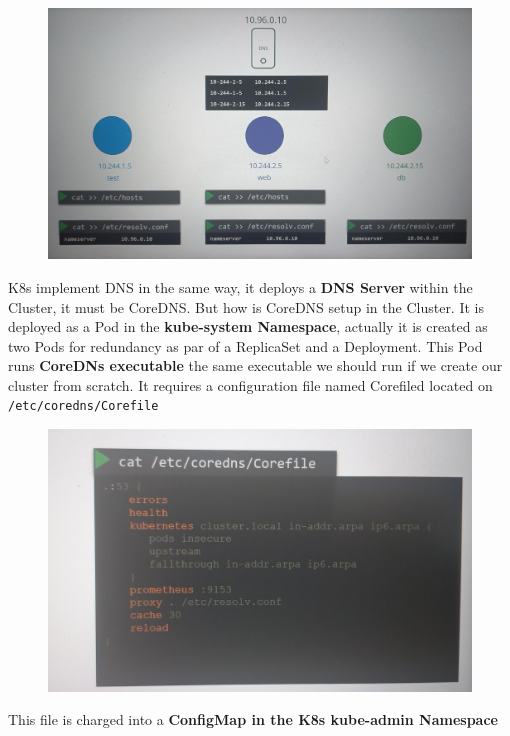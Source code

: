 \documentclass{article}
\begin{document}
\begin{figure}[H]
    \centering
    \includegraphics[width=\textwidth]{pictures/ingress2.png}
\end{figure}

K8s implement DNS in the same way, it deploys a \textbf{DNS Server} within the Cluster, it must be CoreDNS. But how is CoreDNS setup in the Cluster. It is deployed as a Pod in the \textbf{kube-system Namespace}, actually it is created as two Pods for redundancy as par of a ReplicaSet and a Deployment. This Pod runs \textbf{CoreDNs executable} the same executable we should run if we create our cluster from scratch. It requires a configuration file named Corefiled located on \verb|/etc/coredns/Corefile|

\begin{figure}[H]
    \centering
    \includegraphics[scale=0.2]{pictures/ingress3.png}
\end{figure}

This file is charged into a \textbf{ConfigMap in the K8s kube-admin Namespace}
\end{document}

